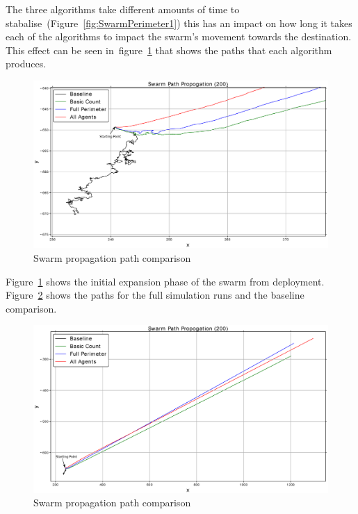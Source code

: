 The three algorithms take different amounts of time to stabalise~(Figure~\ref{fig:SwarmPerimeter1}) this has an impact on how long it takes each of the algorithms to impact the swarm's movement towards the destination. This effect can be seen in~figure~\ref{reduced:SwarmPropagationPathComparison1} that shows the paths that each algorithm produces. 

\begin{figure}[H]
\begin{center}
\includegraphics[width=14cm]{CHAPTER-6/figures/SwarmPropagationComparison1}
\end{center}
\caption{Swarm propagation path comparison\label{reduced:SwarmPropagationPathComparison1}}
\end{figure}

Figure~\ref{reduced:SwarmPropagationPathComparison1} shows the initial expansion phase of the swarm from deployment. Figure~\ref{reduced:SwarmPropagationPathComparison2} shows the paths for the full simulation runs and the baseline comparison.

\begin{figure}[H]
\begin{center}
\includegraphics[width=14cm]{CHAPTER-6/figures/SwarmPropagationComparison2}
\end{center}
\caption{Swarm propagation path comparison\label{reduced:SwarmPropagationPathComparison2}}
\end{figure}


